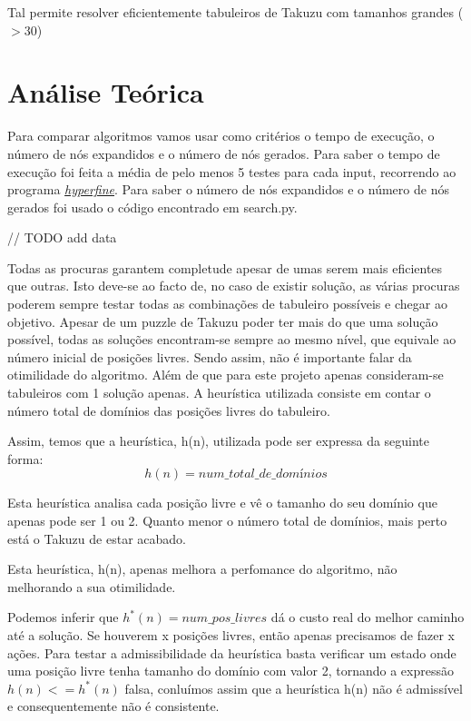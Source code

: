 \documentclass[12pt,a4paper]{article}
\begin{document}
  Tal permite resolver eficientemente tabuleiros de Takuzu com tamanhos grandes ($> 30$)
  

  \section{Análise Teórica}

  Para comparar algoritmos vamos usar como critérios o tempo de execução, o número de nós expandidos e o número de nós gerados.
  Para saber o tempo de execução foi feita a média de pelo menos 5 testes para cada input, recorrendo ao programa \href{https://github.com/sharkdp/hyperfine}{\textit{hyperfine}}.
  Para saber o número de nós expandidos e o número de nós gerados foi usado o código encontrado em search.py.

  // TODO add data

  
  Todas as procuras garantem completude apesar de umas serem mais eficientes que outras. Isto deve-se ao facto de, no caso de existir solução, as várias procuras poderem sempre testar todas as combinações de tabuleiro possíveis e chegar ao objetivo.
  Apesar de um puzzle de Takuzu poder ter mais do que uma solução possível, todas as soluções encontram-se sempre ao mesmo nível, que equivale ao número inicial de posições livres. Sendo assim, não é importante falar da otimilidade do algoritmo.
  Além de que para este projeto apenas consideram-se tabuleiros com 1 solução apenas.
  A heurística utilizada consiste em contar o número total de domínios das posições livres do tabuleiro.
  
  Assim, temos que a heurística, h(n), utilizada pode ser expressa da seguinte forma:
  $$
  h(n) = num\_total\_de\_domínios
  $$

  Esta heurística analisa cada posição livre e vê o tamanho do seu domínio que apenas pode ser 1 ou 2.
  Quanto menor o número total de domínios, mais perto está o Takuzu de estar acabado.
  
  Esta heurística, h(n), apenas melhora a perfomance do algoritmo, não melhorando a sua otimilidade.

  Podemos inferir que $h^*(n) = num\_pos\_livres$ dá o custo real do melhor caminho até a solução. Se houverem x posições livres, então apenas precisamos de fazer x ações.
  Para testar a admissibilidade da heurística basta verificar um estado onde uma posição livre tenha tamanho do domínio com valor 2, tornando a expressão $h(n) <= h^*(n)$ falsa,
  conluímos assim que a heurística h(n) não é admissível e consequentemente não é consistente.
\end{document}
